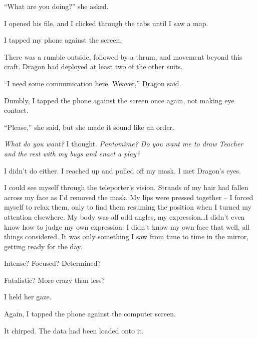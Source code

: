 ``What are you doing?'' she asked.



I opened his file, and I clicked through the tabs until I saw a map.



I tapped my phone against the screen.



There was a rumble outside, followed by a thrum, and movement beyond this craft.  Dragon had deployed at least two of the other suits.



``I need some communication here, Weaver,'' Dragon said.



Dumbly, I tapped the phone against the screen once again, not making eye contact.



``Please,'' she said, but she made it sound like an order.



\emph{What do you want?}  I thought.  \emph{Pantomime?  Do you want me to draw Teacher and the rest with my bugs and enact a play?}



I didn't do either.  I reached up and pulled off my mask.  I met Dragon's eyes.



I could see myself through the teleporter's vision.  Strands of my hair had fallen across my face as I'd removed the mask.  My lips were pressed together – I forced myself to relax them, only to find them resuming the position when I turned my attention elsewhere.  My body was all odd angles, my expression\ldots I didn't even know how to judge my own expression.  I didn't know my own face that well, all things considered.  It was only something I saw from time to time in the mirror, getting ready for the day.



Intense?  Focused?  Determined?



Fatalistic?  More crazy than less?



I held her gaze.



Again, I tapped the phone against the computer screen.



It chirped.  The data had been loaded onto it.



